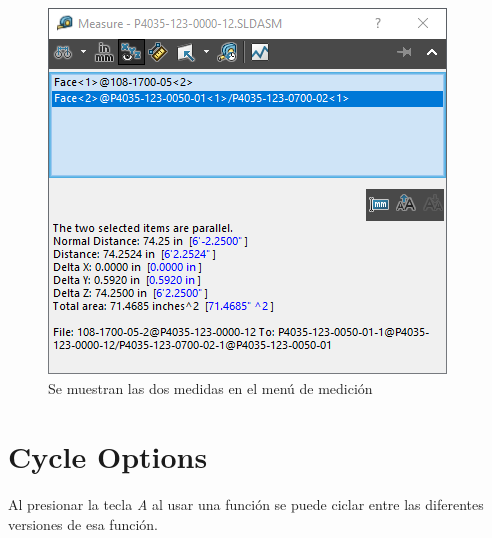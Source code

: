 \documentclass{report}
\begin{document}
\begin{figure}[H]
	\centering
	\includegraphics[width=0.55\linewidth, height=0.35\textheight,keepaspectratio]{Imagenes/solidworks_dual_units03}
	\caption{Se muestran las dos medidas en el menú de medición}
	\label{fig:solidworksdualunits03}
\end{figure}


\chapter{Cycle Options}

Al presionar la tecla \emph{A} al usar una  función se puede ciclar entre las diferentes versiones de esa función.
\end{document}
